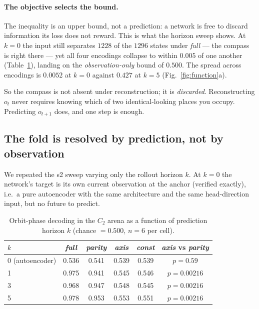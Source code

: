 \documentclass[9pt,lineno]{elife}
\begin{document}
\paragraph{The objective selects the bound.} The inequality is an upper bound, not a prediction:
a network is free to discard information its loss does not reward. This is what the horizon sweep
shows. At $k=0$ the input still separates $1228$ of the $1296$ states under \textit{full} --- the
compass is right there --- yet all four encodings collapse to within $0.005$ of one another
(Table~\ref{tab:horizon}), landing on the \emph{observation-only} bound of $0.500$. The spread
across encodings is $0.0052$ at $k=0$ against $0.427$ at $k=5$ (Fig.~\ref{fig:function}a).

So the compass is not absent under reconstruction; it is \emph{discarded}. Reconstructing
$o_t$ never requires knowing which of two identical-looking places you occupy. Predicting $o_{t+1}$
does, and one step is enough.

\subsection{The fold is resolved by prediction, not by observation}

We repeated the s2 sweep varying only the rollout horizon $k$. At $k=0$ the network's target is
its own current observation at the anchor (verified exactly), i.e.\ a pure autoencoder with the
same architecture and the same head-direction input, but no future to predict.

\begin{table}[t]
\centering
\caption{Orbit-phase decoding in the $C_2$ arena as a function of prediction horizon $k$
(chance $= 0.500$, $n = 6$ per cell).}
\label{tab:horizon}
\begin{tabular}{lccccc}
\toprule
$k$ & \textit{full} & \textit{parity} & \textit{axis} & \textit{const} & \textit{axis} vs \textit{parity} \\
\midrule
0 (autoencoder) & 0.536 & 0.541 & 0.539 & 0.539 & $p = 0.59$ \\
1 & 0.975 & 0.941 & 0.545 & 0.546 & $p = 0.00216$ \\
3 & 0.968 & 0.947 & 0.548 & 0.545 & $p = 0.00216$ \\
5 & 0.978 & 0.953 & 0.553 & 0.551 & $p = 0.00216$ \\
\bottomrule
\end{tabular}
\end{table}
\end{document}
